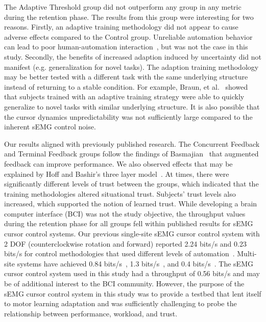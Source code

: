 The Adaptive Threshold group did not outperform any group in any metric during the retention phase.
The results from this group were interesting for two reasons.
Firstly, an adaptive training methodology did not appear to cause adverse effects compared to the Control group.
Unreliable automation behavior can lead to poor human-automation interaction~\cite{RN54}, but was not the case in this study.
Secondly, the benefits of increased adaption induced by uncertainty did not manifest (e.g. generalization for novel tasks).
The adaption training methodology may be better tested with a different task with the same underlying structure instead of returning to a stable condition.
For example, Braun, et al.~\cite{RN36} showed that subjects trained with an adaptive training strategy were able to quickly generalize to novel tasks with similar underlying structure.
It is also possible that the cursor dynamics unpredictability was not sufficiently large compared to the inherent sEMG control noise.

Our results aligned with previously published research.
The Concurrent Feedback and Terminal Feedback groups follow the findings of Basmajian~\cite{RN27} that augmented feedback can improve performance.
We also observed effects that may be explained by Hoff and Bashir's three layer model~\cite{RN39}.
At times, there were significantly different levels of trust between the groups, which indicated that the training methodologies altered situational trust.
Subjects' trust levels also increased, which supported the notion of learned trust.
While developing a brain computer interface (BCI) was not the study objective, the throughput values during the retention phase for all groups fell within published results for sEMG cursor control systems.
Our previous single-site sEMG cursor control system with 2 DOF (counterclockwise rotation and forward) reported 2.24 bits/s and 0.23 bits/s for control methodologies that used different levels of automation~\cite{RN45}.
Multi-site systems have achieved 0.84 bits/s~\cite{RN55}, 1.3 bits/s~\cite{RN56}, and 0.4 bits/s~\cite{RN57}.
The sEMG cursor control system used in this study had a throughput of 0.56 bits/s and may be of additional interest to the BCI community.
However, the purpose of the sEMG cursor control system in this study was to provide a testbed that lent itself to motor learning adaptation and was sufficiently challenging to probe the relationship between performance, workload, and trust.

